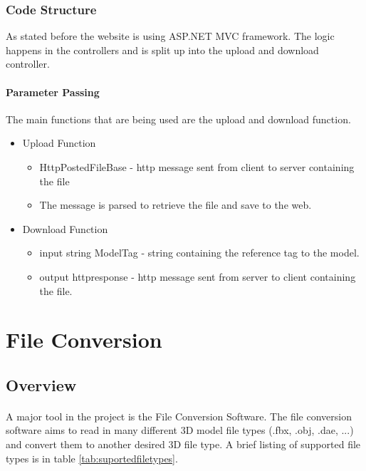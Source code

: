     \subsubsection{Code Structure}
    As stated before the website is using ASP.NET MVC framework. 
    The logic happens in the controllers and is split up into the upload and download controller.
    
    \paragraph{Parameter Passing}
    \hfill \break
    The main functions that are being used are the upload and download function.
    
    \begin{itemize}
        \item Upload Function
        \begin{itemize}
           \item HttpPostedFileBase - http message sent from client to server containing the file
           \item The message is parsed to retrieve the file and save to the web.
        \end{itemize}

        \item Download Function
        \begin{itemize}
            \item input string ModelTag - string containing the reference tag to the model.
            \item output httpresponse - http message sent from server to client containing the file. 
        \end{itemize}
    \end{itemize}


 \section{File Conversion}

    \subsection{Overview}
    \paragraph{}
    A major tool in the project is the File Conversion Software.  
    The file conversion software aims to read in many different 3D model file types (.fbx, .obj, .dae, ...) and convert them to another desired 3D file type.  
    A brief listing of supported file types is in table \ref{tab:suportedfiletypes}.
    
